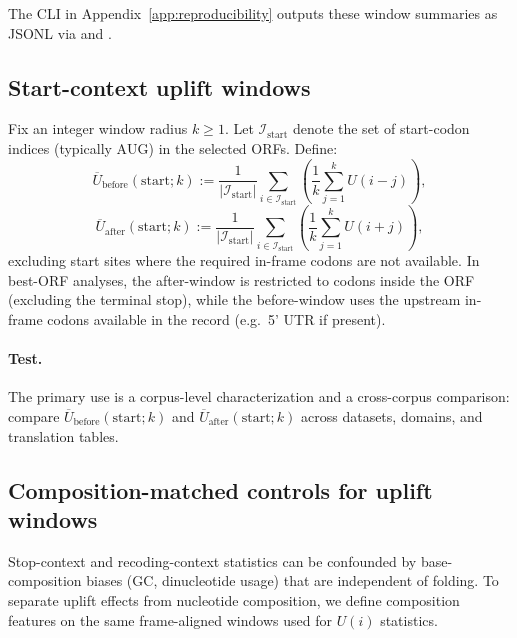 The CLI in Appendix~\ref{app:reproducibility} outputs these window summaries as JSONL via  and .

\subsection{Start-context uplift windows}
\label{app:start_context_windows}

Fix an integer window radius $k\ge 1$.
Let $\mathcal{I}_{\mathrm{start}}$ denote the set of start-codon indices (typically $\mathrm{AUG}$) in the selected ORFs.
Define:
\[
\overline{U}_{\mathrm{before}}(\mathrm{start};k)
:=
\frac{1}{|\mathcal{I}_{\mathrm{start}}|}
\sum_{i\in\mathcal{I}_{\mathrm{start}}}
\left(
\frac{1}{k}\sum_{j=1}^{k} U(i-j)
\right),
\]
\[
\overline{U}_{\mathrm{after}}(\mathrm{start};k)
:=
\frac{1}{|\mathcal{I}_{\mathrm{start}}|}
\sum_{i\in\mathcal{I}_{\mathrm{start}}}
\left(
\frac{1}{k}\sum_{j=1}^{k} U(i+j)
\right),
\]
excluding start sites where the required in-frame codons are not available.
In best-ORF analyses, the after-window is restricted to codons inside the ORF (excluding the terminal stop), while the before-window uses the upstream in-frame codons available in the record (e.g.\ 5' UTR if present).

\paragraph{Test.}
The primary use is a corpus-level characterization and a cross-corpus comparison:
compare $\overline{U}_{\mathrm{before}}(\mathrm{start};k)$ and $\overline{U}_{\mathrm{after}}(\mathrm{start};k)$ across datasets, domains, and translation tables.

\subsection{Composition-matched controls for uplift windows}
\label{app:composition_controls}

Stop-context and recoding-context statistics can be confounded by base-composition biases (GC, dinucleotide usage) that are independent of folding.
To separate uplift effects from nucleotide composition, we define composition features on the same frame-aligned windows used for $U(i)$ statistics.

